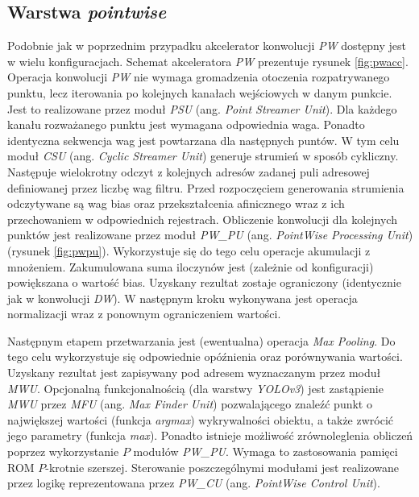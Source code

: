 \subsection{Warstwa \emph{pointwise}}
Podobnie jak w poprzednim przypadku akcelerator konwolucji \emph{PW} dostępny jest w wielu konfiguracjach.
Schemat akceleratora \emph{PW} prezentuje rysunek \ref{fig:pwacc}.
Operacja konwolucji \emph{PW} nie wymaga gromadzenia otoczenia rozpatrywanego punktu, lecz iterowania po kolejnych kanałach wejściowych w danym punkcie.
Jest to realizowane przez moduł \emph{PSU} (ang. \emph{Point Streamer Unit}).
Dla każdego kanału rozważanego punktu jest wymagana odpowiednia waga.
Ponadto identyczna sekwencja wag jest powtarzana dla następnych puntów.
W tym celu moduł \emph{CSU} (ang. \emph{Cyclic Streamer Unit}) generuje strumień w sposób cykliczny.
Następuje wielokrotny odczyt z kolejnych adresów zadanej puli adresowej definiowanej przez liczbę wag filtru. 
Przed rozpoczęciem generowania strumienia odczytywane są wag bias oraz przekształcenia afinicznego wraz z ich przechowaniem w odpowiednich rejestrach.
Obliczenie konwolucji dla kolejnych punktów jest realizowane przez moduł \emph{PW\_PU} (ang. \emph{PointWise Processing Unit}) (rysunek \ref{fig:pwpu}).
Wykorzystuje się do tego celu operacje akumulacji z mnożeniem.
Zakumulowana suma iloczynów jest (zależnie od konfiguracji) powiększana o wartość bias.
Uzyskany rezultat zostaje ograniczony (identycznie jak w konwolucji \emph{DW}).
W następnym kroku wykonywana jest operacja normalizacji wraz z ponownym ograniczeniem wartości.

Następnym etapem przetwarzania jest (ewentualna) operacja \emph{Max Pooling}.
Do tego celu wykorzystuje się odpowiednie opóźnienia oraz porównywania wartości.
Uzyskany rezultat jest zapisywany pod adresem wyznaczanym przez moduł \emph{MWU}.
Opcjonalną funkcjonalnością (dla warstwy \emph{YOLOv3}) jest zastąpienie \emph{MWU} przez \emph{MFU} (ang. \emph{Max Finder Unit}) pozwalającego znaleźć punkt o największej wartości (funkcja \emph{argmax}) wykrywalności obiektu, a także zwrócić jego parametry (funkcja \emph{max}).
Ponadto istnieje możliwość zrównoleglenia obliczeń poprzez wykorzystanie $P$ modułów \emph{PW\_PU}. 
Wymaga to zastosowania pamięci ROM $P$-krotnie szerszej. 
Sterowanie poszczególnymi modułami jest realizowane przez logikę reprezentowana przez \emph{PW\_CU} (ang. \emph{PointWise Control Unit}).

